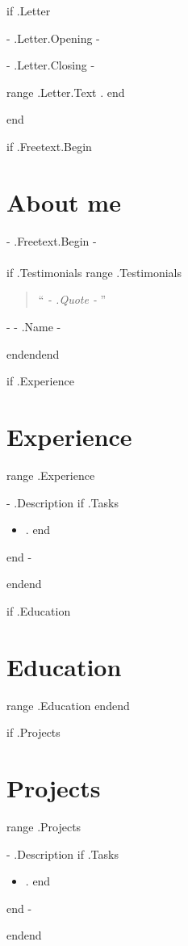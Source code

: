\documentclass[10pt,a4paper,sans]{moderncv}
\newcommand{\chapquote}[2]{\begin{quotation} \enquote{\textit{#1}} \end{quotation} \begin{flushright} - #2\end{flushright} }
\begin{document}
{{if .Letter}}
\date{ {{- .Letter.Date -}} }
\opening{ {{- .Letter.Opening -}} }
\closing{ {{- .Letter.Closing -}} }
\makelettertitle
{{range .Letter.Text}}
{{.}}
{{end}}
\makeletterclosing

\pagebreak

{{end}}


\makecvtitle

{{if .Freetext.Begin}}\section{About me}
{{- .Freetext.Begin -}}
\\~\\
{{if .Testimonials}}
{{range .Testimonials}}\chapquote{ {{- .Quote -}} }{ {{- .Name -}} }
{{end}}{{end}}{{end}}


{{if .Experience}}\section{Experience}
{{range .Experience}}
{ {{- .Description}} 
  {{if .Tasks}}\begin{itemize}
    {{range .Tasks}} \item {{.}}
    {{end}}\end{itemize}
  {{end -}} }
{{end}}{{end}}

{{if .Education}}\section{Education}
{{range .Education}}
{{end}}{{end}}

{{if .Projects}}\section{Projects}
{{range .Projects}}
{ {{- .Description}} 
  {{if .Tasks}}\begin{itemize}
    {{range .Tasks}} \item {{.}}
    {{end}}\end{itemize}
  {{end -}} }
{{end}}{{end}}
\end{document}
